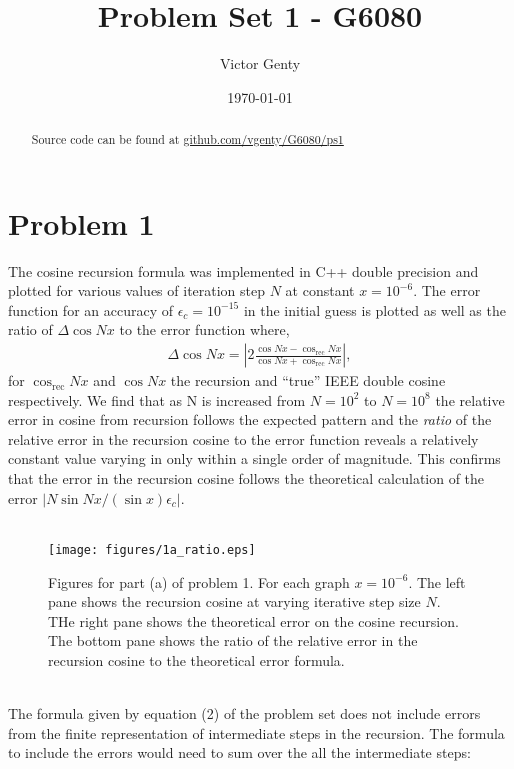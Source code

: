 \documentclass[singlepage,notitlepage,nofootinbib,11pt]{revtex4-1}
\begin{document}
\title{Problem Set 1 - G6080}
\author{Victor Genty}
\date{\today}
\begin{abstract}
\centering
Source code can be found at \href{https://github.com/vgenty/G6080/tree/master/ps1}{github.com/vgenty/G6080/ps1}
\end{abstract}
\maketitle
\section{Problem 1}
The cosine recursion formula  was implemented in C++ double precision and plotted for various values of iteration step $N$ at constant $x=10^{-6}$. The error function for an accuracy of $\epsilon_c = 10^{-15}$ in the initial guess is plotted as well as the ratio of $\Delta\cos Nx$ to the error function where,
\begin{align*}
\Delta\cos N x = \left|2\frac{\cos N x - \cos_{\text{rec}}Nx}{\cos N x + \cos_{\text{rec}}Nx}\right|,
\end{align*}
for $\cos_{\text{rec}} Nx$ and $\cos Nx$ the recursion and ``true'' IEEE double cosine respectively. We find that as N is increased from $N=10^{2}$ to $N=10^8$ the relative error in cosine from recursion follows the expected pattern and the {\it ratio} of the relative error in the recursion cosine to the error function reveals a relatively constant value varying in only within a single order of magnitude. This confirms that the error in the recursion cosine follows the theoretical calculation of the error $|N\sin N x/(\sin x)\epsilon_c|$.
\begin{figure}[h]
  \centering
{}
\\
  \texttt{[image: figures/1a\_ratio.eps]}
  \hfill
  \caption{Figures for part (a) of problem 1. For each graph $x = 10^{-6}$. The left pane shows the recursion cosine at varying iterative step size $N$. THe right pane shows the theoretical error on the cosine recursion. The bottom pane shows the ratio of the relative error in the recursion cosine to the theoretical error formula.}
\end{figure}\\
\indent The formula given by equation (2) of the problem set does not include errors from the finite representation of intermediate steps in the recursion. The formula to include the errors would need to sum over the all the intermediate steps:
\end{document}
